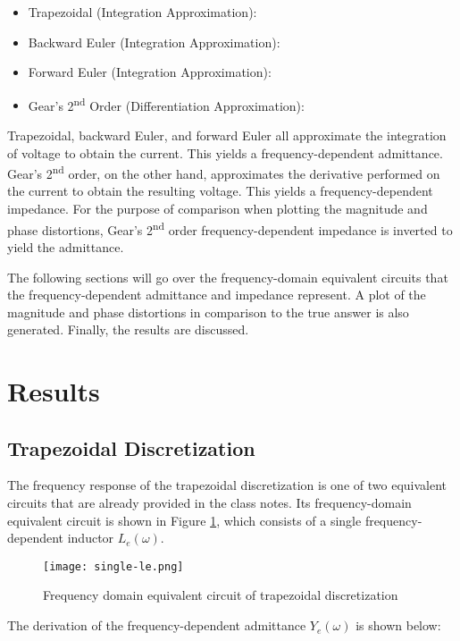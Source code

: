 \documentclass[10pt, oneside, letterpaper]{article}
\begin{document}
\begin{itemize}
  \item Trapezoidal (Integration Approximation): 
  \item Backward Euler (Integration Approximation): 
  \item Forward Euler (Integration Approximation): 
  \item Gear's 2\textsuperscript{nd} Order (Differentiation Approximation): 
\end{itemize}

Trapezoidal, backward Euler, and forward Euler all approximate the integration of voltage to obtain the current. This yields a frequency-dependent admittance. Gear's 2\textsuperscript{nd} order, on the other hand, approximates the derivative performed on the current to obtain the resulting voltage. This yields a frequency-dependent impedance. For the purpose of comparison when plotting the magnitude and phase distortions, Gear's 2\textsuperscript{nd} order frequency-dependent impedance is inverted to yield the admittance.

The following sections will go over the frequency-domain equivalent circuits that the frequency-dependent admittance and impedance represent. A plot of the magnitude and phase distortions in comparison to the true answer is also generated. Finally, the results are discussed.

\section{Results}

\subsection{Trapezoidal Discretization}

The frequency response of the trapezoidal discretization is one of two equivalent circuits that are already provided in the class notes. Its frequency-domain equivalent circuit is shown in Figure \ref{trapezoidal-circuit}, which consists of a single frequency-dependent inductor $L_e(\omega{})$.

\begin{figure}[H]
  \centering
  \texttt{[image: single-le.png]}
  \caption{Frequency domain equivalent circuit of trapezoidal discretization}
  \label{trapezoidal-circuit}
\end{figure}

The derivation of the frequency-dependent admittance $Y_e{}(\omega{})$ is shown below:
\end{document}

